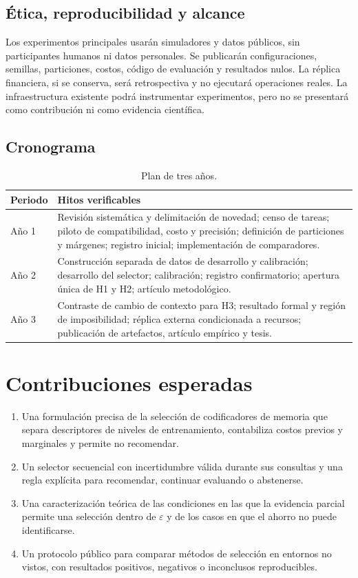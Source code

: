 \documentclass[11pt,letterpaper]{article}
\begin{document}
\subsection{Ética, reproducibilidad y alcance}

Los experimentos principales usarán simuladores y datos públicos, sin participantes humanos ni datos personales.
Se publicarán configuraciones, semillas, particiones, costos, código de evaluación y resultados nulos.
La réplica financiera, si se conserva, será retrospectiva y no ejecutará operaciones reales.
La infraestructura existente podrá instrumentar experimentos, pero no se presentará como contribución ni como evidencia científica.

\subsection{Cronograma}

\begin{table}[H]
\centering
\caption{Plan de tres años.}
\label{tab:timeline}
\begin{tabularx}{\textwidth}{@{}L{2.0cm}Y@{}}
\toprule
\textbf{Periodo} & \textbf{Hitos verificables} \\
\midrule
Año 1 &
Revisión sistemática y delimitación de novedad; censo de tareas; piloto de compatibilidad, costo y precisión; definición de particiones y márgenes; registro inicial; implementación de comparadores. \\
Año 2 &
Construcción separada de datos de desarrollo y calibración; desarrollo del selector; calibración; registro confirmatorio; apertura única de H1 y H2; artículo metodológico. \\
Año 3 &
Contraste de cambio de contexto para H3; resultado formal y región de imposibilidad; réplica externa condicionada a recursos; publicación de artefactos, artículo empírico y tesis. \\
\bottomrule
\end{tabularx}
\end{table}

\section{Contribuciones esperadas}

\begin{enumerate}
  \item Una formulación precisa de la selección de codificadores de memoria que separa descriptores de niveles de entrenamiento, contabiliza costos previos y marginales y permite no recomendar.
  \item Un selector secuencial con incertidumbre válida durante sus consultas y una regla explícita para recomendar, continuar evaluando o abstenerse.
  \item Una caracterización teórica de las condiciones en las que la evidencia parcial permite una selección dentro de $\varepsilon$ y de los casos en que el ahorro no puede identificarse.
  \item Un protocolo público para comparar métodos de selección en entornos no vistos, con resultados positivos, negativos o inconclusos reproducibles.
\end{enumerate}
\end{document}
